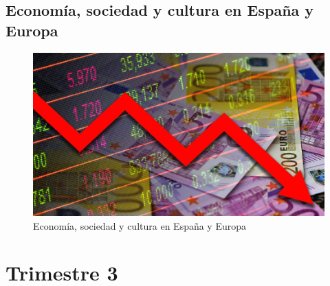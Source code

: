 \documentclass[12pt, a4paper]{book}
\begin{document}





\chapter{Economía, sociedad y cultura en España y Europa}

\begin{figure}[!ht]
    \centering
    \includegraphics[width=1\linewidth]{Tema4/00_Economia.jpg}
    \caption{Economía, sociedad y cultura en España y Europa}
    \label{fig:economia}
\end{figure}





\part*{Trimestre 3}




\end{document}
